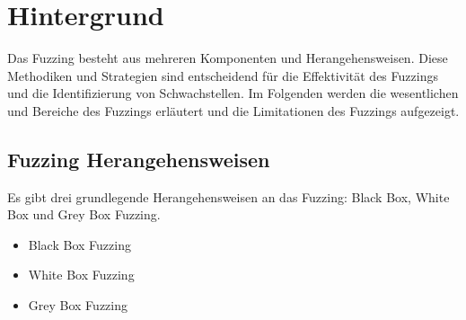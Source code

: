 
\section{Hintergrund}\label{sec:hintergrund}
Das Fuzzing besteht aus mehreren Komponenten und Herangehensweisen.
Diese Methodiken und Strategien sind entscheidend für die Effektivität des Fuzzings und die
Identifizierung von Schwachstellen.
Im Folgenden werden die wesentlichen und Bereiche des Fuzzings erläutert und die Limitationen des Fuzzings aufgezeigt.
\subsection{Fuzzing Herangehensweisen}\label{subsec:testing-methoden}
Es gibt drei grundlegende Herangehensweisen an das Fuzzing: Black Box, White Box und Grey Box Fuzzing.
\begin{itemize}
    \item Black Box Fuzzing
    \item White Box Fuzzing
    \item Grey Box Fuzzing
\end{itemize}
